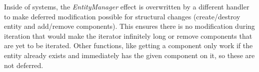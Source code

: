 Inside of systems, the \textit{EntityManager} effect is overwritten by a different handler to make deferred modification possible for structural changes (create/destroy entity and add/remove components). This ensures there is no modification during iteration that would make the iterator infinitely long or remove components that are yet to be iterated. Other functions, like getting a component only work if the entity already exists and immediately has the given component on it, so these are not deferred.
